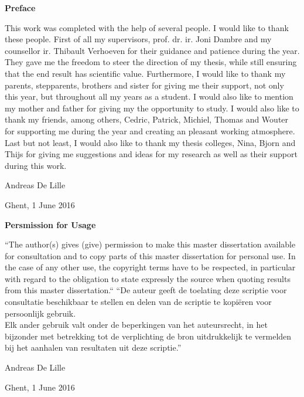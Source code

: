 \newpage

\noindent \textbf{\huge Preface}

\vspace{1.5cm}

\noindent

This work was completed with the help of several people. I would like to thank these people. First of all my supervisors, prof. dr. ir. Joni Dambre and my counsellor ir. Thibault Verhoeven for their guidance and patience during the year. They gave me the freedom to steer the direction of my thesis, while still ensuring that the end result has scientific value.
\npar
Furthermore, I would like to thank my parents, stepparents, brothers and sister for giving me their support, not only this year, but throughout all my years as a student. I would also like to mention my mother and father for giving my the opportunity to study.
\npar
I would also like to thank my friends, among others, Cedric, Patrick, Michiel, Thomas and Wouter for supporting me during the year and creating an pleasant working atmosphere. 
\npar
Last but not least, I would also like to thank my thesis colleges, Nina, Bjorn and Thijs for giving me suggestions and ideas for my research as well as their support during this work.

\addvspace{3cm}

\hfill \noindent Andreas De Lille

\hfill \noindent Ghent, 1 June 2016


\addvspace{9cm}

\doclicenseThis

\clearpage

\noindent \textbf{\huge Persmission for Usage}
\vspace{1.5cm}

\noindent
``The author(s) gives (give) permission to make this master dissertation available for consultation
and to copy parts of this master dissertation for personal use.
 In the case of any other use, the copyright terms have to be respected, in particular with regard to
the obligation to state expressly the source when quoting results from this master dissertation.``
\npar
``De auteur geeft de toelating deze scriptie voor consultatie beschikbaar
te stellen en delen van de scriptie te kopi\"eren voor persoonlijk
gebruik.\\
Elk ander gebruik valt onder de beperkingen van het auteursrecht,
in het bijzonder met betrekking tot de verplichting de bron uitdrukkelijk
te vermelden bij het aanhalen van resultaten uit deze scriptie.''
\addvspace{4cm}

\hfill \noindent Andreas De Lille

\hfill \noindent Ghent, 1 June 2016